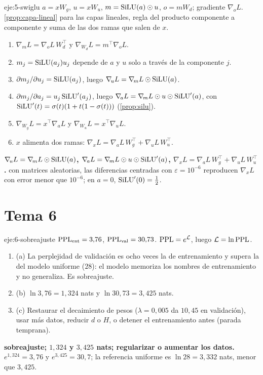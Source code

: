 \begin{solucion}{eje:5-swiglu}
\datos $a=xW_g$, $u=xW_u$, $m=\operatorname{SiLU}(a)\odot u$, $o=mW_d$; gradiente $\nabla_{\!o}L$.
\planteamiento \cref{prop:capa-lineal} para las capas lineales, regla del producto componente a componente y suma de las dos ramas que salen de $x$.
\pasos
\begin{enumerate}[label=\arabic*.]
  \item $\nabla_{\!m}L=\nabla_{\!o}L\,W_d^{\top}$ y $\nabla_{\!W_d}L=m^{\top}\nabla_{\!o}L$.
  \item $m_j=\operatorname{SiLU}(a_j)u_j$ depende de $a$ y $u$ solo a través de la componente $j$.
  \item $\partial m_j/\partial u_j=\operatorname{SiLU}(a_j)$, luego $\nabla_{\!u}L=\nabla_{\!m}L\odot\operatorname{SiLU}(a)$.
  \item $\partial m_j/\partial a_j=u_j\operatorname{SiLU}'(a_j)$, luego $\nabla_{\!a}L=\nabla_{\!m}L\odot u\odot\operatorname{SiLU}'(a)$, con $\operatorname{SiLU}'(t)=\sigma(t)(1+t(1-\sigma(t)))$ (\cref{prop:silu}).
  \item $\nabla_{\!W_g}L=x^{\top}\nabla_{\!a}L$ y $\nabla_{\!W_u}L=x^{\top}\nabla_{\!u}L$.
  \item $x$ alimenta dos ramas: $\nabla_{\!x}L=\nabla_{\!a}L\,W_g^{\top}+\nabla_{\!u}L\,W_u^{\top}$.
\end{enumerate}
\resultado \textbf{$\nabla_{\!u}L=\nabla_{\!m}L\odot\operatorname{SiLU}(a)$, $\nabla_{\!a}L=\nabla_{\!m}L\odot u\odot\operatorname{SiLU}'(a)$, $\nabla_{\!x}L=\nabla_{\!a}L\,W_g^{\top}+\nabla_{\!u}L\,W_u^{\top}$.}
\comprobacion con matrices aleatorias, las diferencias centradas con $\varepsilon=10^{-6}$ reproducen $\nabla_{\!x}L$ con error menor que $10^{-6}$; en $a=0$, $\operatorname{SiLU}'(0)=\tfrac12$.
\end{solucion}

\section{Tema 6}

\begin{solucion}{eje:6-sobreajuste}
\datos $\operatorname{PPL}_{\text{ent}}=3{,}76$, $\operatorname{PPL}_{\text{val}}=30{,}73$.
\planteamiento $\operatorname{PPL}=e^{\mathcal{L}}$, luego $\mathcal{L}=\ln\operatorname{PPL}$.
\pasos
\begin{enumerate}[label=\arabic*.]
  \item (a) La perplejidad de validación es ocho veces la de entrenamiento y supera la del modelo uniforme ($28$): el modelo memoriza los nombres de entrenamiento y no generaliza. Es sobreajuste.
  \item (b) $\ln 3{,}76=1{,}324$ nats y $\ln 30{,}73=3{,}425$ nats.
  \item (c) Restaurar el decaimiento de pesos ($\lambda=0{,}005$ da $10{,}45$ en validación), usar más datos, reducir $d$ o $H$, o detener el entrenamiento antes (parada temprana).
\end{enumerate}
\resultado \textbf{sobreajuste; $1{,}324$ y $3{,}425$ nats; regularizar o aumentar los datos.}
\comprobacion $e^{1{,}324}=3{,}76$ y $e^{3{,}425}=30{,}7$; la referencia uniforme es $\ln 28=3{,}332$ nats, menor que $3{,}425$.
\end{solucion}

